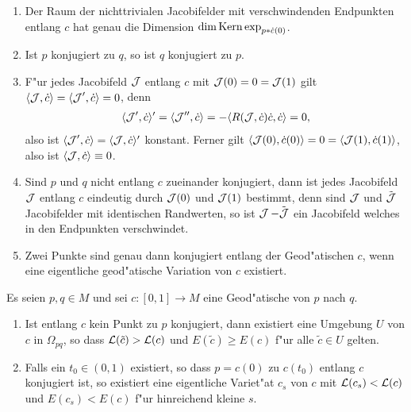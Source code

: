 \begin{bem}\begin{enumerate}[label=\arabic*),leftmargin=*]
  \item
    Der Raum der nichttrivialen Jacobifelder mit verschwindenden Endpunkten entlang $c$ hat genau die Dimension $\dim \operatorname{Kern} \exp_{p*\dot{c}(0)}$.
  \item
    Ist $p$ konjugiert zu $q$, so ist $q$ konjugiert zu $p$.
  \item
    F"ur jedes Jacobifeld $\operatorname{\mathcal{J}}$ entlang $c$ mit $\operatorname{\mathcal{J}}(0) = 0 = \operatorname{\mathcal{J}}(1)$ gilt $\langle \operatorname{\mathcal{J}}, \dot c \rangle = \langle \operatorname{\mathcal{J}}', \dot c \rangle = 0$, denn
    \begin{align*}
      \langle \operatorname{\mathcal{J}}', \dot c \rangle' = \langle \operatorname{\mathcal{J}}'', \dot c \rangle = - \langle R(\operatorname{\mathcal{J}}, \dot c) \dot c, \dot c \rangle = 0,
    \end{align*}
    also ist $\langle \operatorname{\mathcal{J}}', \dot c \rangle = \langle \operatorname{\mathcal{J}}, \dot c \rangle'$ konstant. Ferner gilt $\langle \operatorname{\mathcal{J}}(0), \dot c (0) \rangle = 0 = \langle \operatorname{\mathcal{J}}(1), \dot c(1) \rangle$, also ist $\langle \operatorname{\mathcal{J}}, \dot c \rangle \equiv 0$.
  \item
    Sind $p$ und $q$ nicht entlang $c$ zueinander konjugiert, dann ist jedes Jacobifeld $\operatorname{\mathcal{J}}$ entlang $c$ eindeutig durch $\operatorname{\mathcal{J}}(0)$ und $\operatorname{\mathcal{J}}(1)$ bestimmt, denn sind $\operatorname{\mathcal{J}}$ und $\tilde{\operatorname{\mathcal{J}}}$ Jacobifelder mit identischen Randwerten, so ist $\operatorname{\mathcal{J}} - \tilde{\operatorname{\mathcal{J}}}$ ein Jacobifeld welches in den Endpunkten verschwindet.
  \item
    Zwei Punkte sind genau dann konjugiert entlang der Geod"atischen $c$, wenn eine eigentliche geod"atische Variation von $c$ existiert.
  \end{enumerate}\end{bem}

\begin{Satz}\label{satz-9-8}
  Es seien $p, q \in M$ und sei $c: [0,1] \to M$ eine Geod"atische von $p$ nach $q$.\begin{enumerate}[label=(\roman*),widest=ii]
  \item
    Ist entlang $c$ kein Punkt zu $p$ konjugiert, dann existiert eine Umgebung $U$ von $c$ in $\Omega_{pq}$, so dass $\operatorname{\mathcal{L}}(\tilde c) > \operatorname{\mathcal{L}}(c)$ und $E(\tilde c) \ge E(c)$ f"ur alle $\tilde c \in U$ gelten.
  \item
    Falls ein $t_0 \in (0,1)$ existiert, so dass $p = c(0)$ zu $c(t_0)$ entlang $c$ konjugiert ist, so existiert eine eigentliche Variet"at $c_s$ von $c$ mit $\operatorname{\mathcal{L}}(c_s) < \operatorname{\mathcal{L}}(c)$ und $E(c_s) < E(c)$ f"ur hinreichend kleine $s$.
  \end{enumerate}\end{Satz}

